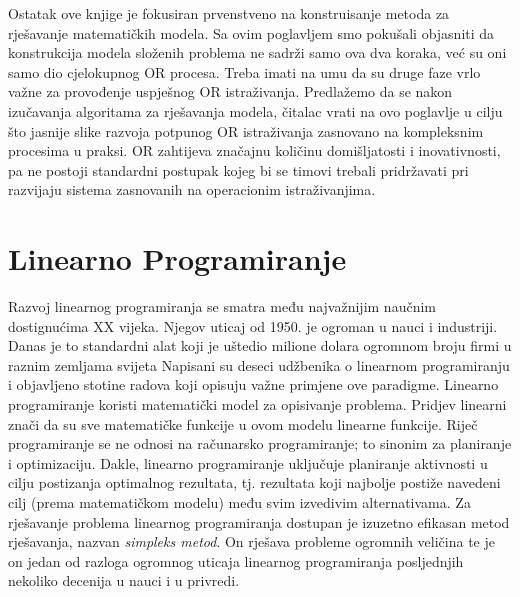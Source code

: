 \documentclass[a4paper, utf8, 11pt, colorlinks]{article}
\begin{document}
Ostatak ove knjige je fokusiran prvenstveno na konstruisanje metoda za rješavanje matematičkih modela. Sa ovim poglavljem  smo  pokušali objasniti da konstrukcija modela složenih problema ne sadrži samo ova dva koraka, već su oni samo dio cjelokupnog OR procesa. Treba imati na umu da su druge faze vrlo važne za provođenje uspješnog OR istraživanja. Predlažemo da se nakon izučavanja algoritama za rješavanja modela, čitalac vrati na ovo poglavlje u cilju što jasnije slike razvoja potpunog OR istraživanja zasnovano na kompleksnim procesima u praksi.  OR zahtijeva značajnu količinu domišljatosti i inovativnosti, pa ne postoji standardni postupak kojeg bi se timovi trebali pridržavati pri razvijaju sistema zasnovanih na operacionim istraživanjima. %
\newpage

\section{Linearno Programiranje} 
   
Razvoj linearnog programiranja se smatra među najvažnijim naučnim dostignu\-ćima XX vijeka. Njegov uticaj od 1950. je ogroman u nauci i industriji. Danas je to standardni alat koji je uštedio milione dolara ogromnom broju firmi u raznim zemljama svijeta  Napisani su deseci udžbenika
o linearnom programiranju i objavljeno stotine radova koji opisuju važne primjene ove paradigme.  Linearno programiranje koristi matematički model za opisivanje problema. 
Pridjev linearni znači da su   sve matematičke funkcije u ovom modelu linearne funkcije. Riječ programiranje se ne odnosi na računarsko programiranje; to sinonim za planiranje i optimizaciju. Dakle, linearno programiranje uključuje planiranje aktivnosti u cilju postizanja optimalnog rezultata, tj. rezultata koji najbolje postiže navedeni cilj (prema matematičkom modelu) među svim izvedivim alternativama.  Za rješavanje problema linearnog programiranja dostupan je izuzetno efikasan metod rješavanja, nazvan \emph{simpleks metod}. On rješava probleme ogromnih veličina te je on jedan od razloga ogromnog uticaja linearnog  programiranja posljednjih nekoliko decenija u nauci i u privredi.
\end{document}
